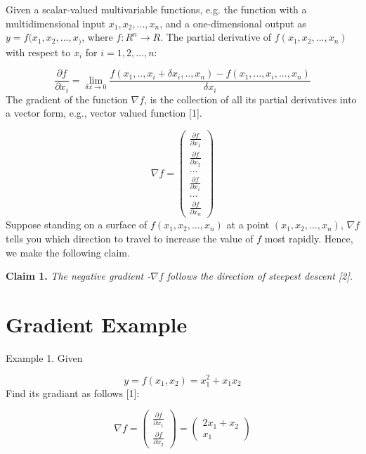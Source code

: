 \documentclass[conference]{IEEEtran}
\begin{document}
Given a scalar-valued multivariable functions,
e.g. the function with a multidimensional input
$x_1, x_2, ..., x_n$, and 
a one-dimensional output as 
$y=f(x_1, x_2, ..., x_)$, where 
$f : R^n \to R$. The partial 
derivative of $f(x_1, x_2, ..., x_n)$ with respect
to $x_i$ for $i=1,2,...,n$: 

\begin{equation}
\frac{ \partial f } { \partial x_i } = 
\lim_{\delta x\to 0} 
\frac{ f(x_1,.., x_i + \delta x_i, .., x_n) 
- f(x_1,..., x_i, ..., x_n)} 
{ \delta x_i }
\end{equation}
The gradient of the function $\nabla f$,
is the collection of all its partial derivatives into 
a vector form, e.g., vector valued function [1]. 

\begin{equation}
\nabla f =  
\left(\begin{array}{c} 
\frac{ \partial f} { \partial x_1 } \\ 
\frac{ \partial f} { \partial x_2 } \\
... \\
\frac{ \partial f} { \partial x_i } \\
... \\
\frac{ \partial f} { \partial x_n } 
\end{array}\right)
\end{equation}
Suppose standing on a surface of 
$f(x_1, x_2, ..., x_n)$ at a point 
$(x_1, x_2, ..., x_n)$, 
$\nabla f$ tells you which direction to 
travel to increase the value of $f$ most rapidly.
Hence, we make the following claim. 

\textbf{Claim 1.} 
\textit{The negative gradient -$\nabla f$ follows
the direction of steepest descent [2].}

\section{Gradient Example}

Example 1. Given 

\begin{equation}
y = f(x_1,x_2) = x_1^2 + x_1 x_2  
\end{equation}
Find its gradiant as follows [1]: 

\begin{equation}
\nabla f =  
\left(\begin{array}{c} 
\frac{ \partial f} { \partial x_1 } \\ 
\frac{ \partial f} { \partial x_2 } 
\end{array}\right)
= 
\left(\begin{array}{c} 
2 x_1 + x_2  \\ 
  x_1 
\end{array}\right)
\end{equation}
\end{document}

